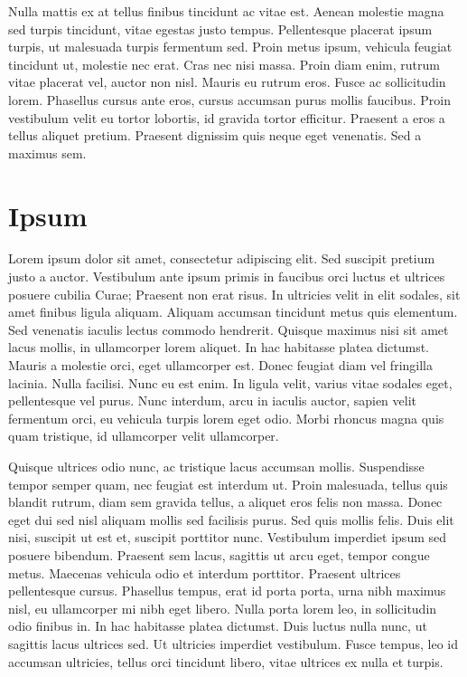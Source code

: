 Nulla mattis ex at tellus finibus tincidunt ac vitae est. Aenean molestie magna sed turpis tincidunt, vitae egestas justo tempus. Pellentesque placerat ipsum turpis, ut malesuada turpis fermentum sed. Proin metus ipsum, vehicula feugiat tincidunt ut, molestie nec erat. Cras nec nisi massa. Proin diam enim, rutrum vitae placerat vel, auctor non nisl. Mauris eu rutrum eros. Fusce ac sollicitudin lorem. Phasellus cursus ante eros, cursus accumsan purus mollis faucibus. Proin vestibulum velit eu tortor lobortis, id gravida tortor efficitur. Praesent a eros a tellus aliquet pretium. Praesent dignissim quis neque eget venenatis. Sed a maximus sem.

\chapter{Ipsum}

Lorem ipsum dolor sit amet, consectetur adipiscing elit. Sed suscipit pretium justo a auctor. Vestibulum ante ipsum primis in faucibus orci luctus et ultrices posuere cubilia Curae; Praesent non erat risus. In ultricies velit in elit sodales, sit amet finibus ligula aliquam. Aliquam accumsan tincidunt metus quis elementum. Sed venenatis iaculis lectus commodo hendrerit. Quisque maximus nisi sit amet lacus mollis, in ullamcorper lorem aliquet. In hac habitasse platea dictumst. Mauris a molestie orci, eget ullamcorper est. Donec feugiat diam vel fringilla lacinia. Nulla facilisi. Nunc eu est enim. In ligula velit, varius vitae sodales eget, pellentesque vel purus. Nunc interdum, arcu in iaculis auctor, sapien velit fermentum orci, eu vehicula turpis lorem eget odio. Morbi rhoncus magna quis quam tristique, id ullamcorper velit ullamcorper.

Quisque ultrices odio nunc, ac tristique lacus accumsan mollis. Suspendisse tempor semper quam, nec feugiat est interdum ut. Proin malesuada, tellus quis blandit rutrum, diam sem gravida tellus, a aliquet eros felis non massa. Donec eget dui sed nisl aliquam mollis sed facilisis purus. Sed quis mollis felis. Duis elit nisi, suscipit ut est et, suscipit porttitor nunc. Vestibulum imperdiet ipsum sed posuere bibendum. Praesent sem lacus, sagittis ut arcu eget, tempor congue metus. Maecenas vehicula odio et interdum porttitor. Praesent ultrices pellentesque cursus. Phasellus tempus, erat id porta porta, urna nibh maximus nisl, eu ullamcorper mi nibh eget libero. Nulla porta lorem leo, in sollicitudin odio finibus in. In hac habitasse platea dictumst. Duis luctus nulla nunc, ut sagittis lacus ultrices sed. Ut ultricies imperdiet vestibulum. Fusce tempus, leo id accumsan ultricies, tellus orci tincidunt libero, vitae ultrices ex nulla et turpis.

